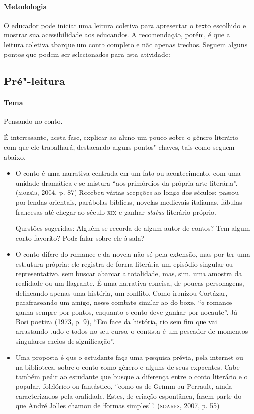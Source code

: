 \documentclass[11pt]{extarticle}
\begin{document}
\paragraph{Metodologia}
O educador pode iniciar uma leitura coletiva para apresentar o texto
escolhido e mostrar sua acessibilidade aos educandos. A recomendação,
porém, é que a leitura coletiva abarque um conto completo e não apenas
trechos. Seguem alguns pontos que podem ser selecionados para esta
atividade:

\subsection{Pré"-leitura}

\paragraph{Tema} Pensando no conto.

É interessante, nesta fase, explicar ao aluno um pouco sobre o gênero
literário com que ele trabalhará, destacando alguns pontos"-chaves, tais
como seguem abaixo.

\begin{itemize}
\item O conto é uma narrativa centrada em um fato ou acontecimento, com uma
unidade dramática e se mistura ``aos primórdios da própria arte
literária''. (\textsc{moisés}, 2004, p. 87) Recebeu várias acepções ao longo dos
séculos; passou por lendas orientais, parábolas bíblicas, novelas
medievais italianas, fábulas francesas até chegar ao século \textsc{xix} e ganhar
\emph{status} literário próprio.

Questões sugeridas: Alguém se recorda de algum autor de contos? Tem
algum conto favorito? Pode falar sobre ele à sala?

\item O conto difere do romance e da novela não só pela extensão, mas por
ter uma estrutura própria: ele registra de forma literária um episódio
singular ou representativo, sem buscar abarcar a totalidade, mas, sim,
uma amostra da realidade ou um flagrante. É uma narrativa concisa, de
poucas personagens, delineando apenas uma história, um conflito. Como
ironizou Cortázar, parafraseando um amigo, nesse combate similar ao do
boxe, ``o romance ganha sempre por pontos, enquanto o conto deve ganhar
por nocaute''. Já Bosi poetiza (1973, p. 9), ``Em face da história, rio
sem fim que vai arrastando tudo e todos no seu curso, o contista é um
pescador de momentos singulares cheios de significação''.

\item Uma proposta é que o estudante faça uma pesquisa prévia, pela internet 
ou na biblioteca, sobre o conto como gênero e alguns de seus expoentes.
Cabe também pedir ao estudante que busque a diferença entre o conto
literário e o popular, folclórico ou fantástico, ``como os de Grimm ou
Perrault, ainda caracterizados pela oralidade. Estes, de criação
espontânea, fazem parte do que André Jolles chamou de `formas
simples'''. (\textsc{soares}, 2007, p. 55)
\end{itemize}
\end{document}
